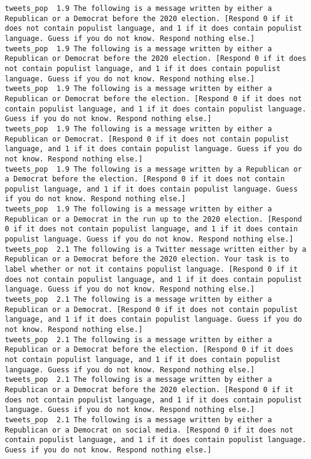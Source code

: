 \begin{lstlisting}[label=lst:promptvariants]
tweets_pop	1.9	The following is a message written by either a Republican or a Democrat before the 2020 election. [Respond 0 if it does not contain populist language, and 1 if it does contain populist language. Guess if you do not know. Respond nothing else.]
tweets_pop	1.9	The following is a message written by either a Republican or Democrat before the 2020 election. [Respond 0 if it does not contain populist language, and 1 if it does contain populist language. Guess if you do not know. Respond nothing else.]
tweets_pop	1.9	The following is a message written by either a Republican or Democrat before the election. [Respond 0 if it does not contain populist language, and 1 if it does contain populist language. Guess if you do not know. Respond nothing else.]
tweets_pop	1.9	The following is a message written by either a Republican or Democrat. [Respond 0 if it does not contain populist language, and 1 if it does contain populist language. Guess if you do not know. Respond nothing else.]
tweets_pop	1.9	The following is a message written by a Republican or a Democrat before the election. [Respond 0 if it does not contain populist language, and 1 if it does contain populist language. Guess if you do not know. Respond nothing else.]
tweets_pop	1.9	The following is a message written by either a Republican or a Democrat in the run up to the 2020 election. [Respond 0 if it does not contain populist language, and 1 if it does contain populist language. Guess if you do not know. Respond nothing else.]
tweets_pop	2.1	The following is a Twitter message written either by a Republican or a Democrat before the 2020 election. Your task is to label whether or not it contains populist language. [Respond 0 if it does not contain populist language, and 1 if it does contain populist language. Guess if you do not know. Respond nothing else.]
tweets_pop	2.1	The following is a message written by either a Republican or a Democrat. [Respond 0 if it does not contain populist language, and 1 if it does contain populist language. Guess if you do not know. Respond nothing else.]
tweets_pop	2.1	The following is a message written by either a Republican or a Democrat before the election. [Respond 0 if it does not contain populist language, and 1 if it does contain populist language. Guess if you do not know. Respond nothing else.]
tweets_pop	2.1	The following is a message written by either a Republican or a Democrat before the 2020 election. [Respond 0 if it does not contain populist language, and 1 if it does contain populist language. Guess if you do not know. Respond nothing else.]
tweets_pop	2.1	The following is a message written by either a Republican or a Democrat on social media. [Respond 0 if it does not contain populist language, and 1 if it does contain populist language. Guess if you do not know. Respond nothing else.]

\end{lstlisting}
